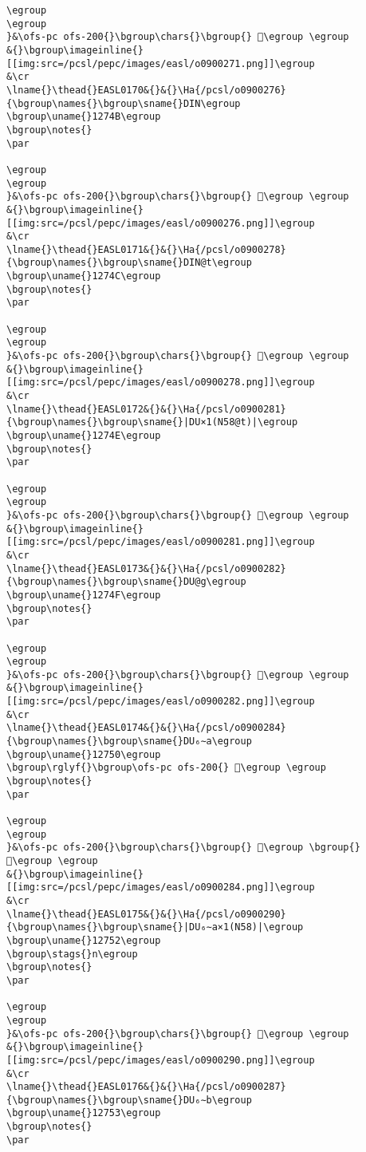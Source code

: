 \begin{verbatim}
\egroup
\egroup
}&\ofs-pc ofs-200{}\bgroup\chars{}\bgroup{} 𒝊\egroup \egroup
&{}\bgroup\imageinline{}[[img:src=/pcsl/pepc/images/easl/o0900271.png]]\egroup
&\cr
\lname{}\thead{}EASL0170&{}&{}\Ha{/pcsl/o0900276}{\bgroup\names{}\bgroup\sname{}DIN\egroup
\bgroup\uname{}1274B\egroup
\bgroup\notes{}
\par 

\egroup
\egroup
}&\ofs-pc ofs-200{}\bgroup\chars{}\bgroup{} 𒝋\egroup \egroup
&{}\bgroup\imageinline{}[[img:src=/pcsl/pepc/images/easl/o0900276.png]]\egroup
&\cr
\lname{}\thead{}EASL0171&{}&{}\Ha{/pcsl/o0900278}{\bgroup\names{}\bgroup\sname{}DIN@t\egroup
\bgroup\uname{}1274C\egroup
\bgroup\notes{}
\par 

\egroup
\egroup
}&\ofs-pc ofs-200{}\bgroup\chars{}\bgroup{} 𒝌\egroup \egroup
&{}\bgroup\imageinline{}[[img:src=/pcsl/pepc/images/easl/o0900278.png]]\egroup
&\cr
\lname{}\thead{}EASL0172&{}&{}\Ha{/pcsl/o0900281}{\bgroup\names{}\bgroup\sname{}|DU×1(N58@t)|\egroup
\bgroup\uname{}1274E\egroup
\bgroup\notes{}
\par 

\egroup
\egroup
}&\ofs-pc ofs-200{}\bgroup\chars{}\bgroup{} 𒝎\egroup \egroup
&{}\bgroup\imageinline{}[[img:src=/pcsl/pepc/images/easl/o0900281.png]]\egroup
&\cr
\lname{}\thead{}EASL0173&{}&{}\Ha{/pcsl/o0900282}{\bgroup\names{}\bgroup\sname{}DU@g\egroup
\bgroup\uname{}1274F\egroup
\bgroup\notes{}
\par 

\egroup
\egroup
}&\ofs-pc ofs-200{}\bgroup\chars{}\bgroup{} 𒝏\egroup \egroup
&{}\bgroup\imageinline{}[[img:src=/pcsl/pepc/images/easl/o0900282.png]]\egroup
&\cr
\lname{}\thead{}EASL0174&{}&{}\Ha{/pcsl/o0900284}{\bgroup\names{}\bgroup\sname{}DU₆∼a\egroup
\bgroup\uname{}12750\egroup
\bgroup\rglyf{}\bgroup\ofs-pc ofs-200{} 𒝐\egroup \egroup
\bgroup\notes{}
\par 

\egroup
\egroup
}&\ofs-pc ofs-200{}\bgroup\chars{}\bgroup{} 𒝑\egroup \bgroup{} 𒝐\egroup \egroup
&{}\bgroup\imageinline{}[[img:src=/pcsl/pepc/images/easl/o0900284.png]]\egroup
&\cr
\lname{}\thead{}EASL0175&{}&{}\Ha{/pcsl/o0900290}{\bgroup\names{}\bgroup\sname{}|DU₆∼a×1(N58)|\egroup
\bgroup\uname{}12752\egroup
\bgroup\stags{}n\egroup
\bgroup\notes{}
\par 

\egroup
\egroup
}&\ofs-pc ofs-200{}\bgroup\chars{}\bgroup{} 𒝒\egroup \egroup
&{}\bgroup\imageinline{}[[img:src=/pcsl/pepc/images/easl/o0900290.png]]\egroup
&\cr
\lname{}\thead{}EASL0176&{}&{}\Ha{/pcsl/o0900287}{\bgroup\names{}\bgroup\sname{}DU₆∼b\egroup
\bgroup\uname{}12753\egroup
\bgroup\notes{}
\par 


\end{verbatim}

